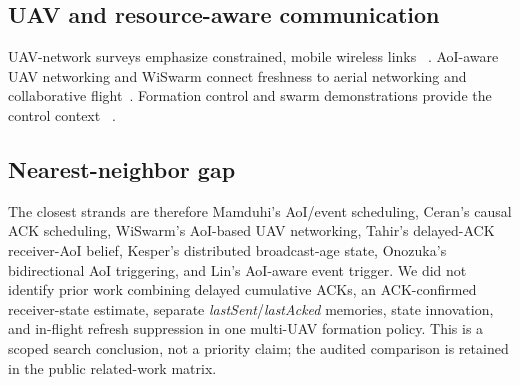 \subsection{UAV and resource-aware communication}
UAV-network surveys emphasize constrained, mobile wireless links
~\cite{gupta2016survey,zeng2016wireless,mozaffari2019tutorial,zeng2019accessing,campion2019uavswarm}.
AoI-aware UAV networking and WiSwarm connect freshness to aerial networking
and collaborative flight~\cite{amodu2023aoiuav,tripathi2023wiswarm}. Formation
control and swarm demonstrations provide the control context
~\cite{olfatisaber2006flocking,oh2015survey,lee2010geometric,mellinger2011minimum,vasarhelyi2018optimized,zhou2022swarm}.

\subsection{Nearest-neighbor gap}
The closest strands are therefore Mamduhi's AoI/event scheduling, Ceran's
causal ACK scheduling, WiSwarm's AoI-based UAV networking, Tahir's delayed-ACK
receiver-AoI belief, Kesper's distributed broadcast-age state, Onozuka's
bidirectional AoI triggering, and Lin's AoI-aware event trigger. We did not
identify prior work combining delayed cumulative ACKs, an ACK-confirmed
receiver-state estimate, separate \emph{lastSent}/\emph{lastAcked} memories,
state innovation, and in-flight refresh suppression in one multi-UAV
formation policy. This is a scoped search conclusion, not a priority claim;
the audited comparison is retained in the public related-work matrix.
